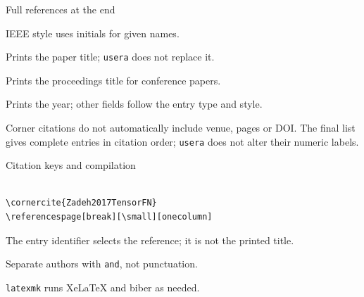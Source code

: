 \begin{frame}{Full references at the end}
  \begin{description}
    \item[\texttt{author}] IEEE style uses initials for given names.
    \item[\texttt{title}] Prints the paper title; \texttt{usera} does not replace it.
    \item[\texttt{booktitle}] Prints the proceedings title for conference papers.
    \item[\texttt{year}] Prints the year; other fields follow the entry type and style.
  \end{description}
  \begin{notebox}
    Corner citations do not automatically include venue, pages or DOI.
    The final list gives complete entries in citation order; \texttt{usera} does not alter their numeric labels.
  \end{notebox}
\end{frame}

\begin{frame}[fragile]{Citation keys and compilation}
  \begin{verbatim}

\cornercite{Zadeh2017TensorFN}
\referencespage[break][\small][onecolumn]
  \end{verbatim}
  \begin{description}[Authors]
    \item[Keys] The entry identifier selects the reference; it is not the printed title.
    \item[Authors] Separate authors with \texttt{and}, not punctuation.
    \item[Build] \texttt{latexmk} runs XeLaTeX and biber as needed.
  \end{description}
\end{frame}
